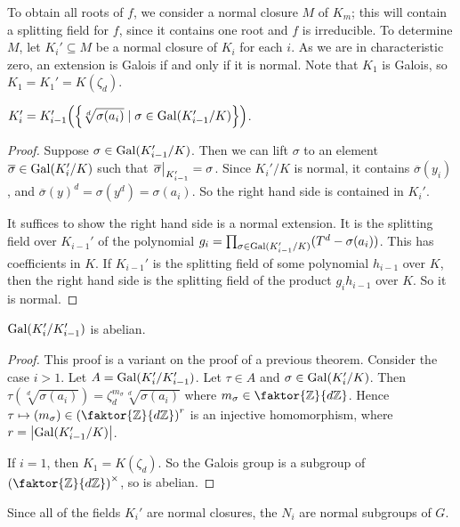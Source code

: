 To obtain all roots of \( f \), we consider a normal closure \( M \) of \( K_m \); this will contain a splitting field for \( f \), since it contains one root and \( f \) is irreducible.
To determine \( M \), let \( K_i' \subseteq M \) be a normal closure of \( K_i \) for each \( i \).
As we are in characteristic zero, an extension is Galois if and only if it is normal.
Note that \( K_1 \) is Galois, so \( K_1 = K_1' = K(\zeta_d) \).
\begin{proposition}
	\( K_i' = K_{i-1}'\qty(\qty{\sqrt[d]{\sigma(a_i)} \mid \sigma \in \operatorname{Gal}(K_{i-1}'/K)}) \).
\end{proposition}
\begin{proof}
	Suppose \( \sigma \in \operatorname{Gal}(K_{i-1}'/K) \).
	Then we can lift \( \sigma \) to an element \( \overline \sigma \in \operatorname{Gal}(K_i'/K) \) such that \( \eval{\overline\sigma}_{K_{i-1}'} = \sigma \).
	Since \( K_i' / K \) is normal, it contains \( \overline \sigma(y_i) \), and \( \overline \sigma(y)^d = \sigma(y^d) = \sigma(a_i) \).
	So the right hand side is contained in \( K_i' \).

	It suffices to show the right hand side is a normal extension.
	It is the splitting field over \( K_{i-1}' \) of the polynomial \( g_i = \prod_{\sigma \in \operatorname{Gal}(K_{i-1}'/K)} (T^d - \sigma(a_i)) \).
	This has coefficients in \( K \).
	If \( K_{i-1}' \) is the splitting field of some polynomial \( h_{i-1} \) over \( K \), then the right hand side is the splitting field of the product \( g_i h_{i-1} \) over \( K \).
	So it is normal.
\end{proof}
\begin{proposition}
	\( \operatorname{Gal}(K_i'/K_{i-1}') \) is abelian.
\end{proposition}
\begin{proof}
	This proof is a variant on the proof of a previous theorem.
	Consider the case \( i > 1 \).
	Let \( A = \operatorname{Gal}(K_i'/K_{i-1}') \).
	Let \( \tau \in A \) and \( \sigma \in \operatorname{Gal}(K_i'/K) \).
	Then \( \tau(\sqrt[d]{\sigma(a_i)}) = \zeta_d^{m_\sigma} \sqrt[d]{\sigma(a_i)} \) where \( m_\sigma \in \faktor{\mathbb Z}{d\mathbb Z} \).
	Hence \( \tau \mapsto (m_\sigma) \in \qty(\faktor{\mathbb Z}{d\mathbb Z})^r \) is an injective homomorphism, where \( r = \abs{\operatorname{Gal}(K_{i-1}'/K)} \).

	If \( i = 1 \), then \( K_1 = K(\zeta_d) \).
	So the Galois group is a subgroup of \( \qty(\faktor{\mathbb Z}{d\mathbb Z})^\times \), so is abelian.
\end{proof}
Since all of the fields \( K_i' \) are normal closures, the \( N_i \) are normal subgroups of \( G \).
